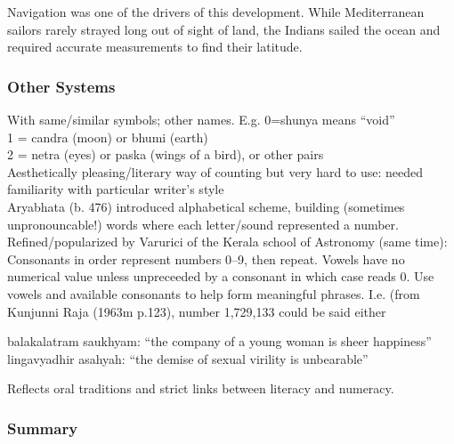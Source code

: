 Navigation was one of the drivers of this development. While Mediterranean sailors rarely strayed long out of sight of land, the Indians sailed the ocean and required accurate measurements to find their latitude.

\iffalse
\subsubsection*{Other Systems}

With same/similar symbols; other names. E.g. 0=shunya means ``void''\\
1 = candra (moon) or bhumi (earth)\\
2 = netra (eyes) or paska (wings of a bird), or other pairs\\
Aesthetically pleasing/literary way of counting but very hard to use: needed familiarity with particular writer's style\\

Aryabhata (b. 476) introduced alphabetical scheme, building (sometimes unpronouncable!) words where each letter/sound represented a number.\\
Refined/popularized by Varurici of the Kerala school of Astronomy (same time):\\
Consonants in order represent numbers 0--9, then repeat. Vowels have no numerical value unless unpreceeded by a consonant in which case reads 0. Use vowels and available consonants to help form meaningful phrases. I.e. (from Kunjunni Raja (1963m p.123), number 1,729,133 could be said either
\begin{center}
balakalatram saukhyam: ``the company of a young woman is sheer happiness''\\
lingavyadhir asahyah: ``the demise of sexual virility is unbearable''
\end{center}

Reflects oral traditions and strict links between literacy and numeracy.





\subsubsection*{Summary}

